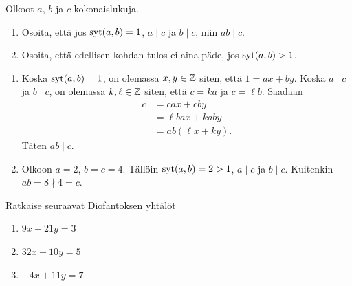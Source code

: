 \documentclass[11pt,a4paper]{amsart}
\begin{document}
\begin{exercise}
  Olkoot \(a\), \(b\) ja \(c\) kokonaislukuja.
  \begin{enumerate}[label=(\alph*), nosep]
    \item Osoita, että jos \(\operatorname{syt}(a, b) = 1\), \(a \mid c\) ja
      \(b \mid c\), niin \(ab \mid c\).
    \item Osoita, että edellisen kohdan tulos ei aina päde, jos
      \(\operatorname{syt}(a, b) > 1\).
  \end{enumerate}
\end{exercise}

\begin{solution}
  \leavevmode\par
  \begin{enumerate}[label=(\alph*), nosep]
    \item Koska \(\operatorname{syt}(a, b) = 1\), on olemassa \(x, y \in \mathbb{Z}\) siten, että
      \(1 = ax + by\).
      Koska \(a \mid c\) ja \(b \mid c\), on olemassa \(k, \ell \in \mathbb{Z}\)
      siten, että \(c = ka\) ja \(c = \ell b\).
      Saadaan
      \[
        \begin{aligned}
          c &= cax + cby \\
          &= \ell bax + kaby \\
          &= ab(\ell x + ky).
        \end{aligned}
      \]
      Täten \(ab \mid c\).
    \item Olkoon \(a = 2\), \(b = c = 4\). Tällöin \(\operatorname{syt}(a, b) = 2 > 1\),
      \(a \mid c\) ja \(b \mid c\). Kuitenkin \(ab = 8 \nmid 4 = c\).
  \end{enumerate}
\end{solution}

\begin{exercise}
  Ratkaise seuraavat Diofantoksen yhtälöt
  \begin{enumerate}[label=(\alph*), nosep]
    \item \(9x + 21y = 3\)
    \item \(32x - 10y = 5\)
    \item \(-4x + 11y = 7\)
  \end{enumerate}
\end{exercise}
\end{document}
